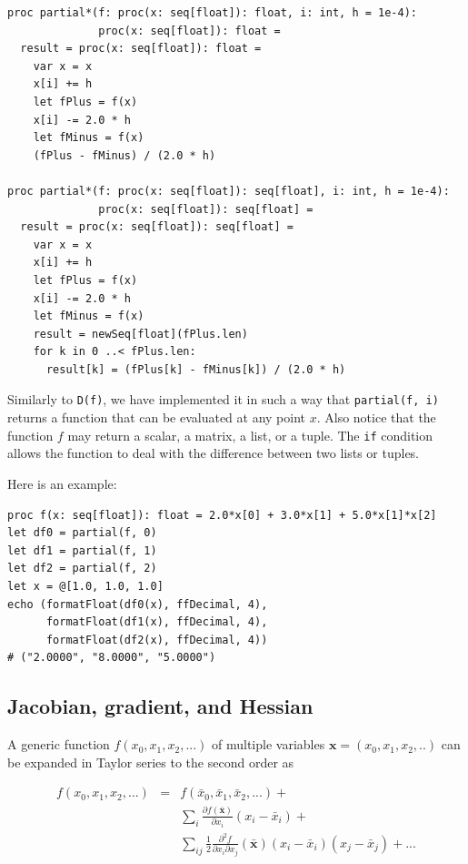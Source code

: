 \documentclass[justified, sixbynine]{tufte-book}
\def\ft{\small\tt}
\theoremstyle{plain}%
\newtheorem * {corollary}{Corollary}
\theoremstyle{definition}
\theoremstyle{remark}
\newtheorem * {remark}{Remark}
\newtheorem * {note}{Note}
\begin{document}
\begin{fullwidth}
\begin{lstlisting}[caption={in file: {\ft nlib/calculus.nim}}]
proc partial*(f: proc(x: seq[float]): float, i: int, h = 1e-4):
              proc(x: seq[float]): float =
  result = proc(x: seq[float]): float =
    var x = x
    x[i] += h
    let fPlus = f(x)
    x[i] -= 2.0 * h
    let fMinus = f(x)
    (fPlus - fMinus) / (2.0 * h)

proc partial*(f: proc(x: seq[float]): seq[float], i: int, h = 1e-4):
              proc(x: seq[float]): seq[float] =
  result = proc(x: seq[float]): seq[float] =
    var x = x
    x[i] += h
    let fPlus = f(x)
    x[i] -= 2.0 * h
    let fMinus = f(x)
    result = newSeq[float](fPlus.len)
    for k in 0 ..< fPlus.len:
      result[k] = (fPlus[k] - fMinus[k]) / (2.0 * h)
\end{lstlisting}

Similarly to {\ft D(f)}, we have implemented it in such a way that {\ft partial(f, i)} returns a function that can be evaluated at any point $x$. Also notice that the function $f$ may return a scalar, a matrix, a list, or a tuple. The {\ft if} condition allows the function to deal with the difference between two lists or tuples.

Here is an example:

\begin{lstlisting}
proc f(x: seq[float]): float = 2.0*x[0] + 3.0*x[1] + 5.0*x[1]*x[2]
let df0 = partial(f, 0)
let df1 = partial(f, 1)
let df2 = partial(f, 2)
let x = @[1.0, 1.0, 1.0]
echo (formatFloat(df0(x), ffDecimal, 4),
      formatFloat(df1(x), ffDecimal, 4),
      formatFloat(df2(x), ffDecimal, 4))
# ("2.0000", "8.0000", "5.0000")
\end{lstlisting}

\goodbreak\subsection{Jacobian, gradient, and Hessian}


A generic function $f(x_0, x_1, x_2, ...)$ of multiple variables $\mathbf{x}=(x_0, x_1, x_2, ..)$ can be expanded in Taylor series to the second order as

\begin{eqnarray}
f(x_0, x_1, x_2, ...) &=& f(\bar x_0, \bar x_1, \bar x_2, ...) + \\
&& \sum_i \frac{\partial f(\mathbf{\bar x})}{\partial x_i}(x_i-\bar x_i) + \\
&& \sum_{ij} \frac12 \frac{\partial^2 f}{\partial x_i\partial x_j}(\mathbf{\bar x})(x_i-\bar x_i)(x_j-\bar x_j) + ...
\end{eqnarray}


\end{fullwidth}
\end{document}
